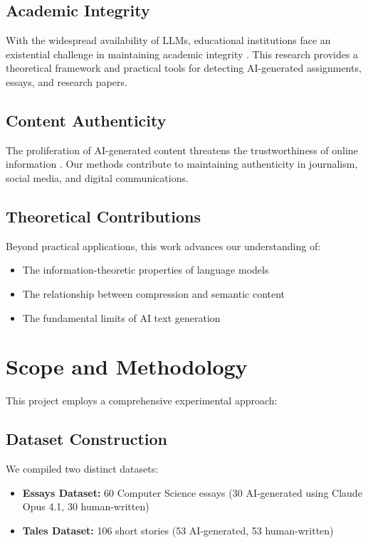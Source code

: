 \documentclass[12pt,a4paper]{report}
\begin{document}
\subsection{Academic Integrity}

With the widespread availability of LLMs, educational institutions face an existential challenge in maintaining academic integrity \cite{wang2023anomaly}. This research provides a theoretical framework and practical tools for detecting AI-generated assignments, essays, and research papers.

\subsection{Content Authenticity}

The proliferation of AI-generated content threatens the trustworthiness of online information \cite{uchendu2020authorship}. Our methods contribute to maintaining authenticity in journalism, social media, and digital communications.

\subsection{Theoretical Contributions}

Beyond practical applications, this work advances our understanding of:
\begin{itemize}
    \item The information-theoretic properties of language models
    \item The relationship between compression and semantic content
    \item The fundamental limits of AI text generation
\end{itemize}

\section{Scope and Methodology}

This project employs a comprehensive experimental approach:

\subsection{Dataset Construction}

We compiled two distinct datasets:
\begin{itemize}
    \item \textbf{Essays Dataset:} 60 Computer Science essays (30 AI-generated using Claude Opus 4.1, 30 human-written)
    \item \textbf{Tales Dataset:} 106 short stories (53 AI-generated, 53 human-written)
\end{itemize}
\end{document}
